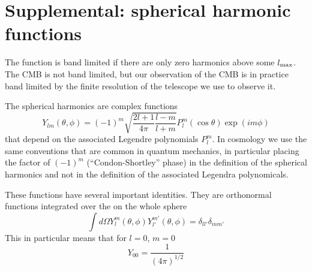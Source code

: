 \section*{Supplemental: spherical harmonic functions}

The function is band limited if there are only zero harmonics above some $l_{\rm max}$.  The CMB is not band limited, but our observation of the CMB is in practice band limited by the finite resolution of the telescope we use to observe it.

The spherical harmonics are complex functions
\begin{equation}
  Y_{lm}(\theta,\phi) = (-1)^m \sqrt{\frac{2 l + 1}{4\pi} \frac{l-m}{l+m}} P_l^m(\cos \theta) \exp(im\phi)
\end{equation}
that depend on the associated Legendre polynomials $P_l^m$.  In cosmology we use the same conventions that are common in quantum mechanics, in particular placing the factor of $(-1)^m$ (``Condon-Shortley'' phase) in the definition of the spherical harmonics and not in the definition of the associated Legendra polynomicals.

These functions have several important identities.  They are orthonormal functions integrated over the on the whole sphere
\begin{equation}
  \int d\Omega Y_l^m (\theta,\phi) Y_{l'}^{m'}(\theta,\phi) = \delta_{ll'} \delta_{mm'}
\end{equation}
This in particular means that for $l=0$, $m=0$
\begin{equation}
  Y_{00} = \frac{1}{(4\pi)^{1/2}}
\end{equation}
